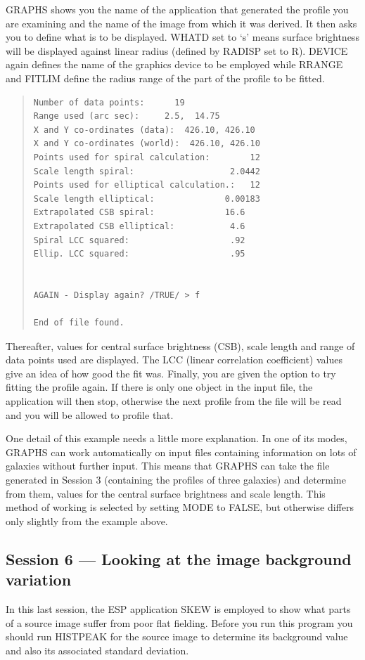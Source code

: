 \documentclass[twoside,11pt]{article}
\newcommand{\xlabel}[1]{}
\newenvironment{myquote}{\begin{quote}\begin{small}}{\end{small}\end{quote}}
\begin{document}
GRAPHS shows you the name of the application that generated the 
profile you are examining and the name of the image from which
it was derived. It then asks you to define what is to be displayed.
WHATD set to `s' means surface brightness will be displayed against
linear radius (defined by RADISP set to R). DEVICE again defines the
name of the graphics device to be employed while RRANGE and FITLIM define the
radius range of the part of the profile to be fitted.

\begin{myquote}
\begin{verbatim}
Number of data points:      19
Range used (arc sec):     2.5,  14.75
X and Y co-ordinates (data):  426.10, 426.10
X and Y co-ordinates (world):  426.10, 426.10
Points used for spiral calculation:        12
Scale length spiral:                   2.0442
Points used for elliptical calculation.:   12
Scale length elliptical:              0.00183
Extrapolated CSB spiral:              16.6
Extrapolated CSB elliptical:           4.6
Spiral LCC squared:                    .92            
Ellip. LCC squared:                    .95
 
 
AGAIN - Display again? /TRUE/ > f
 
End of file found.
\end{verbatim}
\end{myquote}

Thereafter, values for central surface brightness (CSB), scale length and 
range of data points used are displayed. The LCC (linear correlation
coefficient) values give an idea of how good the fit was. Finally, you are 
given the option to try fitting the profile again. If there is only one 
object in the input file, the application will then stop, otherwise the 
next profile from the file will be read and you will be allowed to profile 
that.

One detail of this example needs a little more explanation. In one
of its modes, GRAPHS can work automatically on input files
containing information on lots of galaxies without further 
input. This means that GRAPHS can take the file generated in Session
3 (containing the profiles of three galaxies) and determine from them,
values for the central surface brightness and scale length.
This method of working is selected by setting MODE to FALSE, but otherwise 
differs only slightly from the example above. 


\subsection{Session 6 --- Looking at the image background variation}
\xlabel{SESSION6}
In this last session, the ESP application SKEW is employed to show
what parts of a source image suffer from poor flat fielding.
Before you run this program you should run HISTPEAK for the source image to
determine its background value and also its associated standard deviation.
\end{document}
